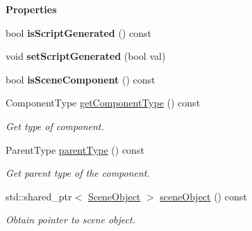 \begin{Indent}\textbf{ Properties}\par
\begin{DoxyCompactItemize}
\item 
\mbox{\label{classrev_1_1_component_abdc9e3c96b9ffc71b8d019148c045baf}} 
bool {\bfseries is\+Script\+Generated} () const
\item 
\mbox{\label{classrev_1_1_component_a9c079b804ad86776163e272f9ff38870}} 
void {\bfseries set\+Script\+Generated} (bool val)
\item 
\mbox{\label{classrev_1_1_component_ab4e556410412dc7b55ee0a2163941081}} 
bool {\bfseries is\+Scene\+Component} () const
\item 
\mbox{\label{classrev_1_1_component_aba2a1b9f6202b20a3bc3c437bfa2d158}} 
Component\+Type \mbox{\hyperlink{classrev_1_1_component_aba2a1b9f6202b20a3bc3c437bfa2d158}{get\+Component\+Type}} () const
\begin{DoxyCompactList}\small\item\em Get type of component. \end{DoxyCompactList}\item 
\mbox{\label{classrev_1_1_component_a4b30248036efb20e8891011cebc9f972}} 
Parent\+Type \mbox{\hyperlink{classrev_1_1_component_a4b30248036efb20e8891011cebc9f972}{parent\+Type}} () const
\begin{DoxyCompactList}\small\item\em Get parent type of the component. \end{DoxyCompactList}\item 
\mbox{\label{classrev_1_1_component_a37eb868cea2c0ada585fe7ab3c07ae70}} 
std\+::shared\+\_\+ptr$<$ \mbox{\hyperlink{classrev_1_1_scene_object}{Scene\+Object}} $>$ \mbox{\hyperlink{classrev_1_1_component_a37eb868cea2c0ada585fe7ab3c07ae70}{scene\+Object}} () const
\begin{DoxyCompactList}\small\item\em Obtain pointer to scene object. \end{DoxyCompactList}\item 
\mbox{\label{classrev_1_1_component_a76bcbb43342679d7b693eef48546854b}} 

\end{DoxyCompactItemize}
\end{Indent}
